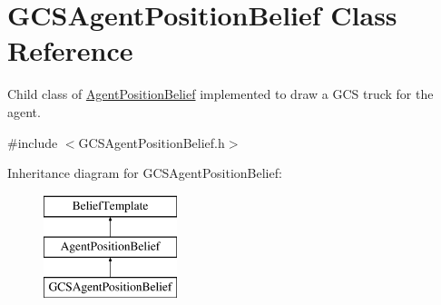 \hypertarget{class_g_c_s_agent_position_belief}{
\section{GCSAgentPositionBelief Class Reference}
\label{class_g_c_s_agent_position_belief}
}


Child class of \hyperlink{class_agent_position_belief}{AgentPositionBelief} implemented to draw a GCS truck for the agent.  




{\ttfamily \#include $<$GCSAgentPositionBelief.h$>$}

Inheritance diagram for GCSAgentPositionBelief:\begin{figure}[H]
\begin{center}
\leavevmode
\includegraphics[height=3.000000cm]{class_g_c_s_agent_position_belief}
\end{center}
\end{figure}
